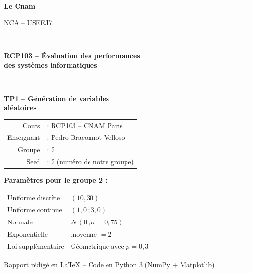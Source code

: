 \documentclass[11pt,a4paper]{article}
\begin{document}
\begin{titlepage}
    \centering
    \vspace*{1.5cm}
    {\Large \textcolor{rouge-cnam}{\textbf{Le Cnam}} \par}
    {\large NCA -- USEEJ7 \par}
    \vspace{2cm}

    \rule{\linewidth}{0.5pt}\\[0.4em]
    {\Huge \textbf{RCP103 -- \'Evaluation des performances\\ des syst\`emes informatiques}}\\[0.4em]
    \rule{\linewidth}{0.5pt}\\

    \vspace{1.5cm}
    {\LARGE \textbf{TP1 -- G\'en\'eration de variables\\ al\'eatoires}}\\[1cm]

    \vspace{1.5cm}
    \begin{tabular}{rl}
        Cours      & : RCP103 -- CNAM Paris \\
        Enseignant & : Pedro Braconnot Velloso \\
        Groupe     & : 2 \\
        Seed       & : 2 (num\'ero de notre groupe) \\
    \end{tabular}

    \vspace{1.5cm}
    \textbf{Param\`etres pour le groupe 2 :}\\[0.4em]
    \begin{tabular}{ll}
        Uniforme discr\`ete & $(10, 30)$ \\
        Uniforme continue   & $(1{,}0\,; 3{,}0)$ \\
        Normale             & $\mathcal{N}(0\,; \sigma = 0{,}75)$ \\
        Exponentielle       & moyenne $= 2$ \\
        Loi suppl\'ementaire & G\'eom\'etrique avec $p = 0{,}3$ \\
    \end{tabular}

    \vfill
    {\small Rapport r\'edig\'e en \LaTeX{} -- Code en Python 3 (NumPy + Matplotlib)}
\end{titlepage}
\end{document}
